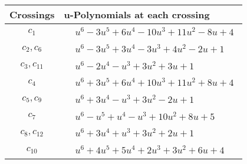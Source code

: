 \documentclass[1p]{elsarticle_modified}
\theoremstyle{definition}
\begin{document}
\begin{tabular}{m{50pt}|m{274pt}}
Crossings & \hspace{64pt}u-Polynomials at each crossing \\
\hline $$\begin{aligned}c_{1}\end{aligned}$$&$\begin{aligned}
&u^6-3 u^5+6 u^4-10 u^3+11 u^2-8 u+4
\end{aligned}$\\
\hline $$\begin{aligned}c_{2},c_{6}\end{aligned}$$&$\begin{aligned}
&u^6-3 u^5+3 u^4-3 u^3+4 u^2-2 u+1
\end{aligned}$\\
\hline $$\begin{aligned}c_{3},c_{11}\end{aligned}$$&$\begin{aligned}
&u^6-2 u^4- u^3+3 u^2+3 u+1
\end{aligned}$\\
\hline $$\begin{aligned}c_{4}\end{aligned}$$&$\begin{aligned}
&u^6+3 u^5+6 u^4+10 u^3+11 u^2+8 u+4
\end{aligned}$\\
\hline $$\begin{aligned}c_{5},c_{9}\end{aligned}$$&$\begin{aligned}
&u^6+3 u^4- u^3+3 u^2-2 u+1
\end{aligned}$\\
\hline $$\begin{aligned}c_{7}\end{aligned}$$&$\begin{aligned}
&u^6- u^5+u^4- u^3+10 u^2+8 u+5
\end{aligned}$\\
\hline $$\begin{aligned}c_{8},c_{12}\end{aligned}$$&$\begin{aligned}
&u^6+3 u^4+u^3+3 u^2+2 u+1
\end{aligned}$\\
\hline $$\begin{aligned}c_{10}\end{aligned}$$&$\begin{aligned}
&u^6+4 u^5+5 u^4+2 u^3+3 u^2+6 u+4
\end{aligned}$\\
\hline
\end{tabular}\\~\\
\end{document}
